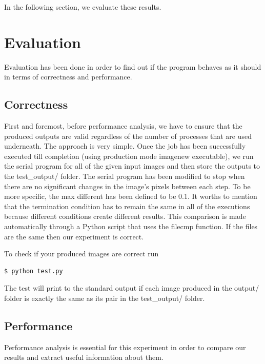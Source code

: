 \documentclass[12pt,a4paper]{article}
\begin{document}
  	In the following section, we evaluate these results.
  
\section{Evaluation}
    Evaluation has been done in order to find out if the program behaves as it should in terms of correctness and performance.

    \subsection{Correctness}
        First and foremost, before performance analysis, we have to ensure that the produced outputs are valid regardless of the number of processes that are used underneath. The approach is very simple. Once the job has been successfully executed till completion (using production mode imagenew executable), we run the serial program for all of the given input images and then store the outputs to the test\_output/ folder. The serial program has been modified to stop when there are no significant changes in the image's pixels between each step. To be more specific, the max different has been defined to be 0.1. It worths to mention that the termination condition has to remain the same in all of the executions because different conditions create different results. This comparison is made automatically through a Python script that uses the filecmp function. If the files are the same then our experiment is correct.

        To check if your produced images are correct run
        \begin{lstlisting}[language=bash]
          $ python test.py
        \end{lstlisting}

        The test will print to the standard output if each image produced in the output/ folder is exactly the same as its pair in the test\_output/ folder.

    \subsection{Performance}
        Performance analysis is essential for this experiment in order to compare our results and extract useful information about them.
\end{document}
